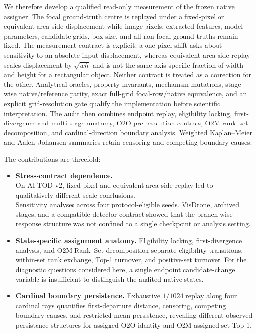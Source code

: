 We therefore develop a qualified read-only measurement of the frozen native assigner. The focal ground-truth centre is replayed under a fixed-pixel or equivalent-area-side displacement while image pixels, extracted features, model parameters, candidate grids, box size, and all non-focal ground truths remain fixed. The measurement contract is explicit: a one-pixel shift asks about sensitivity to an absolute input displacement, whereas equivalent-area-side replay scales displacement by $\sqrt{wh}$ and is not the same axis-specific fraction of width and height for a rectangular object. Neither contract is treated as a correction for the other. Analytical oracles, property invariants, mechanism mutations, stage-wise native/reference parity, exact full-grid focal-row/native equivalence, and an explicit grid-resolution gate qualify the implementation before scientific interpretation. The audit then combines endpoint replay, eligibility locking, first-divergence and multi-stage anatomy, O2O pre-resolution controls, O2M rank--set decomposition, and cardinal-direction boundary analysis. Weighted Kaplan--Meier and Aalen--Johansen summaries retain censoring and competing boundary causes.

The contributions are threefold:
\begin{itemize}[leftmargin=*,nosep]
    \item \textbf{Stress-contract dependence.}\\[-2pt] On AI-TOD-v2, fixed-pixel and equivalent-area-side replay led to qualitatively different scale conclusions.\\[-2pt] Sensitivity analyses across four protocol-eligible seeds, VisDrone, archived stages, and a compatible detector contract showed that the branch-wise response structure was not confined to a single checkpoint or analysis setting.
    \item \textbf{State-specific assignment anatomy.} Eligibility locking, first-divergence analysis, and O2M Rank--Set decomposition separate eligibility transitions, within-set rank exchange, Top-1 turnover, and positive-set turnover. For the diagnostic questions considered here, a single endpoint candidate-change variable is insufficient to distinguish the audited native states.
    \item \textbf{Cardinal boundary persistence.} Exhaustive $1/1024$ replay along four cardinal rays quantifies first-departure distance, censoring, competing boundary causes, and restricted mean persistence, revealing different observed persistence structures for assigned O2O identity and O2M assigned-set Top-1.
\end{itemize}

